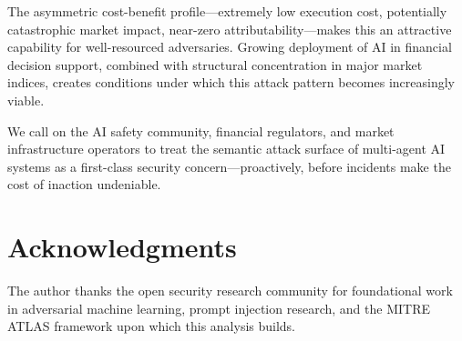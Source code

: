 \documentclass[11pt,a4paper]{article}
\begin{document}
The asymmetric cost-benefit profile---extremely low execution cost, potentially
catastrophic market impact, near-zero attributability---makes this an attractive
capability for well-resourced adversaries. Growing deployment of AI in financial
decision support, combined with structural concentration in major market indices,
creates conditions under which this attack pattern becomes increasingly viable.

We call on the AI safety community, financial regulators, and market
infrastructure operators to treat the semantic attack surface of multi-agent
AI systems as a first-class security concern---proactively, before incidents
make the cost of inaction undeniable.

\section*{Acknowledgments}

The author thanks the open security research community for foundational work
in adversarial machine learning, prompt injection research, and the MITRE
ATLAS framework upon which this analysis builds.
\end{document}
